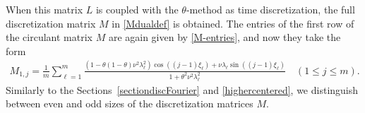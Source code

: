 \documentclass[a4paper]{article}
\begin{document}
When this matrix $L$ is coupled with the $\theta$-method as time discretization, the full discretization
matrix $M$ in \eqref{Mdualdef} is obtained.
The entries of the first row of the circulant matrix $M$ are again given by \eqref{M-entries}, and now
they take the form
\begin{align}\label{eq51}
	M_{1,j}  = \frac{1}{m} \sum_{\ell=1}^{m} \frac{\left(1-\theta(1-\theta)\nu^2\lambda_\ell^2\right)
  \cos((j-1)\xi_\ell) + \nu\lambda_\ell\sin((j-1)\xi_\ell)}{1+\theta^2\nu^2\lambda_\ell^2} \quad (1\le j \le m).
\end{align}
Similarly to the Sections~\ref{sectiondiscFourier} and \ref{highercentered}, we distinguish between even and
odd sizes of the discretization matrices $M$.
\end{document}
